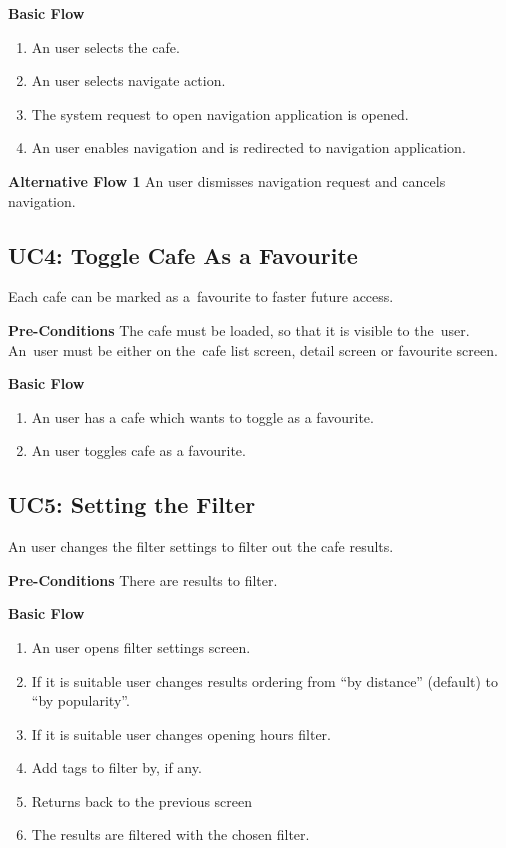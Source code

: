 \newpara
\noindent \textbf{Basic Flow}

\begin{enumerate}
    \item An user selects the cafe.
    \item An user selects navigate action. 
    \item The system request to open navigation application is opened. 
    \item An user enables navigation and is redirected to navigation application. 
\end{enumerate}

\noindent \textbf{Alternative Flow 1} An user dismisses navigation request and cancels navigation.

\subsection{UC4: Toggle Cafe As a Favourite}
Each cafe can be marked as a~favourite to faster future access. 

\newpara
\noindent \textbf{Pre-Conditions} The cafe must be loaded, so that it is visible to the~user. An~user must be either on the~cafe list screen, detail screen or favourite screen. 

\newpara
\noindent \textbf{Basic Flow}

\begin{enumerate}
    \item An user has a cafe which wants to toggle as a favourite.
    \item An user toggles cafe as a favourite.
\end{enumerate}


\subsection{UC5: Setting the Filter}
An user changes the filter settings to filter out the cafe results.

\newpara
\noindent \textbf{Pre-Conditions} There are results to filter.

\newpara
\noindent \textbf{Basic Flow}

\begin{enumerate}
    \item An user opens filter settings screen.
    \item If it is suitable user changes results ordering from ``by distance'' (default) to ``by popularity''.
    \item If it is suitable user changes opening hours filter.
    \item Add tags to filter by, if any.  
    \item Returns back to the previous screen
    \item The results are filtered with the chosen filter.
\end{enumerate}

